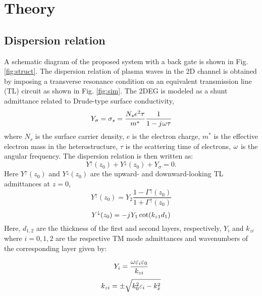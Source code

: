 \documentclass[11pt]{article}
\begin{document}
\section{Theory}
\subsection{Dispersion relation}
%
A schematic diagram of the proposed system with a back gate is shown in Fig. \ref{fig:struct}. The dispersion relation of plasma waves in the 2D channel is obtained by imposing a transverse resonance condition on an equivalent transmission line (TL) circuit \cite{Kastner_1988, Michalski2005} as shown in Fig. \ref{fig:sim}. The 2DEG is modeled as a shunt admittance related to Drude-type surface conductivity,
%
\begin{equation}
  Y_{\sigma} = \sigma_s = \frac{N_s e^2 \tau}{m^{\ast}}\frac{1}{1 - j\mkern1mu \omega \tau}
  \label{eq:Y2deg}
\end{equation}
%
where $N_s$ is the surface carrier density, $e$ is the electron charge, $m^{\ast}$ is the effective electron mass in the heterostructure, $\tau$ is the scattering time of electrons, $\omega$ is the angular frequency. The dispersion relation is then written as:
%
\begin{equation}
  Y^{\uparrow}(z_0) + Y^{\downarrow}(z_0) + Y_{\sigma} = 0.
  \label{eq:dispersion}
\end{equation}
%
Here $Y^{\uparrow}(z_0)$ and $Y^{\downarrow}(z_0)$ are the upward- and downward-looking TL admittances at $z = 0$,
%
\begin{equation}
  Y^{\uparrow}(z_0) = Y_2 \frac{1 - \Gamma^{\uparrow}(z_0)}{1 + \Gamma^{\uparrow}(z_0)}
  \label{eq:Yup}
\end{equation}
%
\begin{equation}
  Y^{\downarrow}(z_0) = -j\mkern1mu Y_1 \cot (k_{z1} d_1)
  \label{eq:Ydown}
\end{equation}
%
Here, $d_{1,2}$ are the thickness of the first and second layers,
respectively,  $Y_{i}$ and $k_{zi}$ where $i = 0,1,2$ are the respective TM mode admittances and wavenumbers of the corresponding layer given by:
%
\begin{multicols}{2}
  \begin{equation}
    Y_i = \frac{\omega \varepsilon_i \varepsilon_0}{k_{zi}}
    \label{eq:Y}
  \end{equation}\break
  \begin{equation}
    k_{zi} = \pm \sqrt{k_0^2 \varepsilon_i - k_x^2}
  \end{equation}
\end{multicols}
\end{document}

